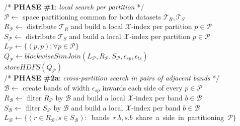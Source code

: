 \begin{algorithm}[!ht]
\begin{small}
	\DontPrintSemicolon

	\nonl /* 	{\bf PHASE \#1}: {\em local search per partition} */ \\
	
	$\mathcal{P} \leftarrow$ space partitioning common for both datasets $\mathcal{T}_{R}, \mathcal{T}_{S}$ \\
	$R_{\mathcal{P}} \leftarrow $ distribute $\mathcal{T}_{R}$ and build a local $\mathcal{X}$-index per partition $p \in \mathcal{P}$\\
	$S_{\mathcal{P}} \leftarrow $ distribute $\mathcal{T}_{S}$ and build a local $\mathcal{X}$-index per partition $p \in \mathcal{P}$\\
	\mbox{$L_{\mathcal{P}} \leftarrow \{ ( p , p ): \forall p \in \mathcal{P} \}$}  \\
	$Q_{\mathcal{P}} \leftarrow blockwiseSimJoin(L_{\mathcal{P}}, R_{\mathcal{P}}, S_{\mathcal{P}},\epsilon_{sp}, \epsilon_{ts})$ \\	
	$storeHDFS(Q_{\mathcal{P}})$   \\

	\nonl /* 	{\bf PHASE \#2a}: {\em cross-partition search in pairs of adjacent bands} */ \\
	
	$\mathcal{B} \leftarrow$ create bands of width $\epsilon_{sp}$ inwards each side of every $p \in \mathcal{P}$ \\
	$R_{\mathcal{B}} \leftarrow $ filter $R_{\mathcal{P}}$ by $\mathcal{B}$ and build a local $\mathcal{X}$-index per band $b \in \mathcal{B}$\\
	$S_{\mathcal{B}} \leftarrow $ filter $S_{\mathcal{P}}$ by $\mathcal{B}$ and build a local $\mathcal{X}$-index per band $b \in \mathcal{B}$\\
	\mbox{$L_{\mathcal{B}} \leftarrow \{ ( r \in R_{\mathcal{B}}, s \in S_{\mathcal{B}}):$ bands $r.b, s.b$ share a side in partitioning $\mathcal{P}\}$} \\
	
	

\end{small}
\end{algorithm}

